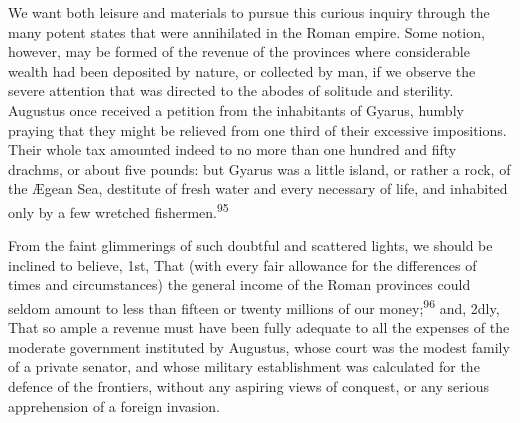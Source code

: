 
We want both leisure and materials to
pursue this curious inquiry through the many potent states that
were annihilated in the Roman empire. Some notion, however, may
be formed of the revenue of the provinces where considerable
wealth had been deposited by nature, or collected by man, if we
observe the severe attention that was directed to the abodes of
solitude and sterility. Augustus once received a petition from
the inhabitants of Gyarus, humbly praying that they might be
relieved from one third of their excessive impositions. Their
whole tax amounted indeed to no more than one hundred and fifty
drachms, or about five pounds: but Gyarus was a little island, or
rather a rock, of the Ægean Sea, destitute of fresh water and
every necessary of life, and inhabited only by a few wretched
fishermen.\textsuperscript{95}


From the faint glimmerings of such doubtful and scattered lights,
we should be inclined to believe, 1st, That (with every fair
allowance for the differences of times and circumstances) the
general income of the Roman provinces could seldom amount to less
than fifteen or twenty millions of our money;\textsuperscript{96} and, 2dly, That
so ample a revenue must have been fully adequate to all the
expenses of the moderate government instituted by Augustus, whose
court was the modest family of a private senator, and whose
military establishment was calculated for the defence of the
frontiers, without any aspiring views of conquest, or any serious
apprehension of a foreign invasion.


